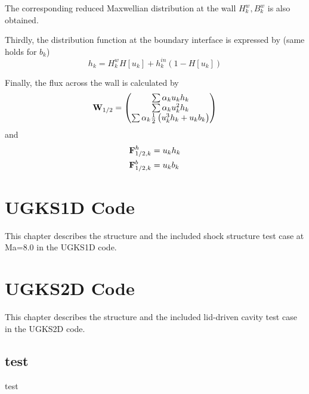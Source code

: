 \documentclass[a4paper]{book}
\begin{document}
The corresponding reduced Maxwellian distribution at the wall $H_k^w,B_k^w$ is also obtained.

Thirdly, the distribution function at the boundary interface is expressed by (same holds for $b_k$)
$$h_k = H_k^wH[u_k]+h_k^{in}(1-H[u_k])$$

Finally, the flux across the wall is calculated by
$$
{\bf W}_{1/2} = 
\begin{pmatrix}
    \sum\alpha_k u_k h_k\\
    \sum\alpha_k u_k^2 h_k\\
    \sum\alpha_k \frac{1}{2}\left(u_k^3 h_k+u_k b_k\right)
\end{pmatrix} 
$$
and
$$
\begin{aligned}
    {\bf F}_{1/2,k}^h &= u_k h_k\\
    {\bf F}_{1/2,k}^b &= u_k b_k
\end{aligned} 
$$

\chapter{UGKS1D Code}
This chapter describes the structure and the included shock structure test case at Ma=8.0 in the UGKS1D code.

\chapter{UGKS2D Code}
This chapter describes the structure and the included lid-driven cavity test case in the UGKS2D code.
\section{test}
test

\backmatter

\end{document}
